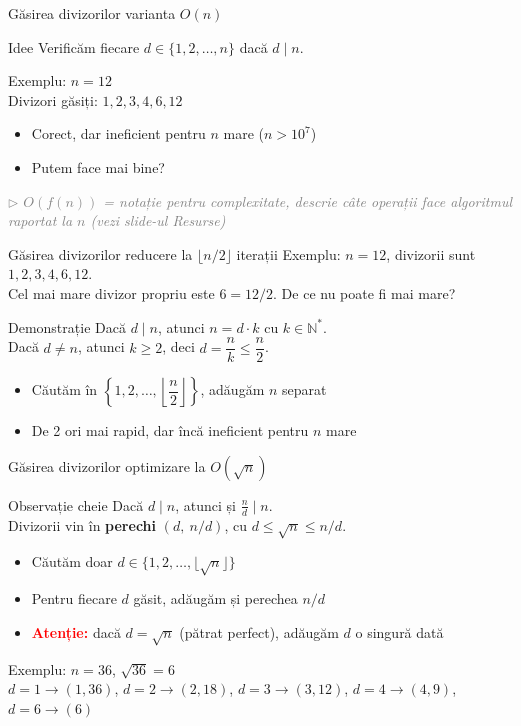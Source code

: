 ﻿\documentclass{beamer}
\newcommand{\beginnote}[1]{%
  \vfill
  {\footnotesize\textcolor{gray}{\textit{$\triangleright$ #1 (vezi slide-ul \emph{Resurse})}}}%
}
\begin{document}
\begin{frame}{Găsirea divizorilor \textemdash{} varianta $O(n)$}
  \begin{block}{Idee}
    Verificăm fiecare $d \in \{1, 2, \ldots, n\}$ dacă $d \mid n$.
  \end{block}
  \bigskip
  Exemplu: $n = 12$ \\
  Divizori găsiți: $1, 2, 3, 4, 6, 12$
  \bigskip
  \begin{itemize}
    \item Corect, dar ineficient pentru $n$ mare ($n > 10^7$)
    \item Putem face mai bine?
  \end{itemize}
  \beginnote{$O(f(n))$ = notație pentru complexitate, descrie câte operații face algoritmul raportat la $n$}
\end{frame}

\begin{frame}{Găsirea divizorilor \textemdash{} reducere la $\lfloor n/2 \rfloor$ iterații}
  Exemplu: $n = 12$, divizorii sunt $1, 2, 3, 4, 6, 12$. \\
  Cel mai mare divizor propriu este $6 = 12/2$. De ce nu poate fi mai mare?
  \bigskip
  \begin{block}{Demonstrație}
    Dacă $d \mid n$, atunci $n = d \cdot k$ cu $k \in \mathbb{N}^*$. \\
    Dacă $d \neq n$, atunci $k \geq 2$, deci $d = \dfrac{n}{k} \leq \dfrac{n}{2}$.
  \end{block}
  \bigskip
  \begin{itemize}
    \item Căutăm în $\left\{1, 2, \ldots, \left\lfloor\dfrac{n}{2}\right\rfloor\right\}$, adăugăm $n$ separat
    \item De 2 ori mai rapid, dar încă ineficient pentru $n$ mare
  \end{itemize}
\end{frame}

\begin{frame}{Găsirea divizorilor \textemdash{} optimizare la $O(\sqrt{n})$}
  \begin{block}{Observație cheie}
    Dacă $d \mid n$, atunci și $\frac{n}{d} \mid n$. \\
    Divizorii vin în \textbf{perechi} $(d,\ n/d)$, cu $d \leq \sqrt{n} \leq n/d$.
  \end{block}
  \bigskip
  \begin{itemize}
    \item Căutăm doar $d \in \{1, 2, \ldots, \lfloor\sqrt{n}\rfloor\}$
    \item Pentru fiecare $d$ găsit, adăugăm și perechea $n/d$
    \item  \textbf{\textcolor{red}{Atenție:}} dacă $d = \sqrt{n}$ (pătrat perfect), adăugăm $d$ o singură dată
  \end{itemize}
  \bigskip
  Exemplu: $n = 36$, $\sqrt{36} = 6$ \\
  $d=1\to(1,36)$, $d=2\to(2,18)$, $d=3\to(3,12)$, $d=4\to(4,9)$, $d=6\to(6)$
\end{frame}
\end{document}
